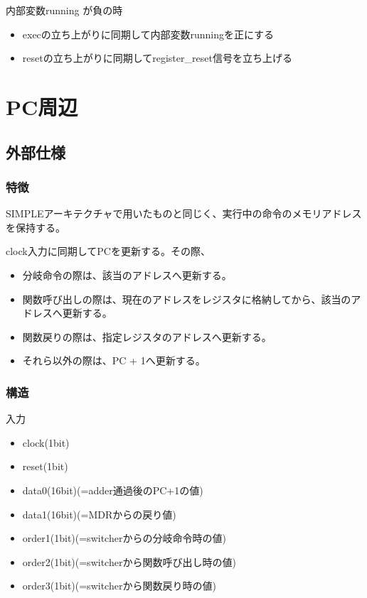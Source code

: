 \documentclass{jsreport}
\begin{document}
            内部変数running が負の時
            \begin{itemize}
            	\item execの立ち上がりに同期して内部変数runningを正にする
                \item resetの立ち上がりに同期してregister\_reset信号を立ち上げる
            \end{itemize}

\section{PC周辺}
	\subsection{外部仕様}
        \subsubsection{特徴}
        	SIMPLEアーキテクチャで用いたものと同じく、実行中の命令のメモリアドレスを保持する。
            
            clock入力に同期してPCを更新する。その際、\\
            \begin{itemize}
            \item 分岐命令の際は、該当のアドレスへ更新する。
            \item 関数呼び出しの際は、現在のアドレスをレジスタに格納してから、該当のアドレスへ更新する。
            \item 関数戻りの際は、指定レジスタのアドレスへ更新する。
			\item それら以外の際は、PC + 1へ更新する。
            \end{itemize}
        
        \subsubsection{構造}
        
            入力
            \begin{itemize}
            \item clock(1bit)
            \item reset(1bit)
            \item data0(16bit)(=adder通過後のPC+1の値)
            \item data1(16bit)(=MDRからの戻り値)
            \item order1(1bit)(=switcherからの分岐命令時の値)
            \item order2(1bit)(=switcherから関数呼び出し時の値)
            \item order3(1bit)(=switcherから関数戻り時の値)
            \end{itemize}
            
\end{document}
